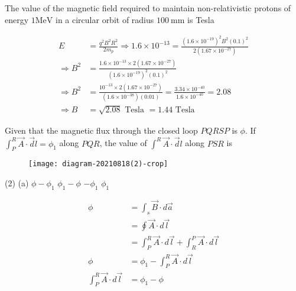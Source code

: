 \begin{enumerate}
\begin{answer}
	\end{answer}
	\begin{minipage}{\textwidth}
		\item The value of the magnetic field required to maintain non-relativistic protons of energy $1 \mathrm{MeV}$ in a circular orbit of radius $100 \mathrm{~mm}$ is Tesla
	\end{minipage}
	\begin{answer}
	\begin{align*}	
	E&=\frac{q^{2} B^{2} R^{2}}{2 m_{p}} \Rightarrow 1.6 \times 10^{-13}=\frac{\left(1.6 \times 10^{-19}\right)^{2} B^{2}(0.1)^{2}}{2\left(1.67 \times 10^{-27}\right)}\\
	\Rightarrow B^{2}&=\frac{1.6 \times 10^{-13} \times 2\left(1.67 \times 10^{-27}\right)}{\left(1.6 \times 10^{-19}\right)^{2}(0.1)^{2}} \\
	\Rightarrow B^{2}&=\frac{10^{-13} \times 2\left(1.67 \times 10^{-27}\right)}{\left(1.6 \times 10^{-38}\right)(0.01)}=\frac{3.34 \times 10^{-40}}{1.6 \times 10^{-40}}=2.08\\
	\Rightarrow B&=\sqrt{2.08} \text { Tesla }=1.44 \text { Tesla }
	\end{align*}	
	\end{answer}
	\begin{minipage}{\textwidth}
		\item Given that the magnetic flux through the closed loop $P Q R S P$ is $\phi$. If $\int_{P}^{R} \vec{A} \cdot \vec{d} l=\phi_{1}$ along $P Q R$, the value of $\int^{R} \vec{A} \cdot \vec{d} l$ along $P S R$ is
		\begin{figure}[H]
			\centering
			\texttt{[image: diagram-20210818(2)-crop]}
		\end{figure}
	\end{minipage}
	\begin{tasks}(2)
		\task[\textbf{A.}](a) $\phi-\phi_{1}$
		\task[\textbf{B.}] $\phi_{1}-\phi$
		\task[\textbf{C.}]$-\phi_{1}$
		\task[\textbf{D.}] $\phi_{1}$
	\end{tasks}
	\begin{answer}
		\begin{align*}
		\phi&=\int_{s} \vec{B} \cdot d \vec{a}\\&=\oint \vec{A} \cdot d \vec{l}\\&=\int_{P}^{R} \vec{A} \cdot d \vec{l}+\int_{R}^{P} \vec{A} \cdot d \vec{l} \\ \phi&=\phi_{1}-\int_{P}^{R} \vec{A} \cdot d \vec{l} \\ \int_{P}^{R} \vec{A} \cdot d \vec{l}&=\phi_{1}-\phi
		\end{align*}
	

\end{answer}
\end{enumerate}
